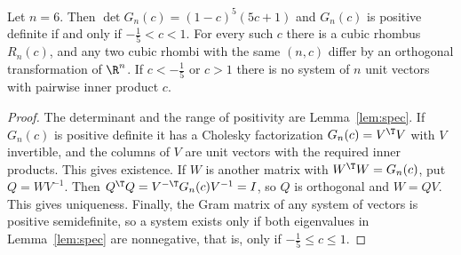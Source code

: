\begin{theorem}\label{thm:main}
Let $n=6$. Then $\det G_n(c)=\left(1 - c\right)^{5} \left(5 c + 1\right)$ and $G_n(c)$ is positive definite if and only if $- \frac{1}{5}<c<1$.
For every such $c$ there is a cubic rhombus $R_n(c)$, and any two cubic rhombi with the same $(n,c)$ differ by an orthogonal transformation of $\R^n$.
If $c<- \frac{1}{5}$ or $c>1$ there is no system of $n$ unit vectors with pairwise inner product $c$.
\end{theorem}
\begin{proof}
The determinant and the range of positivity are Lemma~\ref{lem:spec}.
If $G_n(c)$ is positive definite it has a Cholesky factorization $G_n(c)=V^\T V$ with $V$ invertible, and the columns of $V$ are unit vectors with the required inner products. This gives existence.
If $W$ is another matrix with $W^\T W=G_n(c)$, put $Q=WV^{-1}$. Then $Q^\T Q=V^{-\T}G_n(c)V^{-1}=I$, so $Q$ is orthogonal and $W=QV$. This gives uniqueness.
Finally, the Gram matrix of any system of vectors is positive semidefinite, so a system exists only if both eigenvalues in Lemma~\ref{lem:spec} are nonnegative, that is, only if $- \frac{1}{5}\le c\le1$.
\end{proof}
